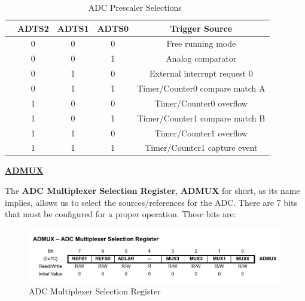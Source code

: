 \begin{table}[H]
    \centering
    \begin{tabular}[t]{lcccc}
        \toprule
        & \textbf{ADTS2} & \textbf{ADTS1} & \textbf{ADTS0} & \textbf{Trigger Source}\\
        \midrule
        & 0 & 0 & 0 & Free running mode               \\
        & 0 & 0 & 1 & Analog comparator               \\
        & 0 & 1 & 0 & External interrupt request 0    \\
        & 0 & 1 & 1 & Timer/Counter0 compare match A  \\
        & 1 & 0 & 0 & Timer/Counter0 overflow         \\
        & 1 & 0 & 1 & Timer/Counter1 compare match B  \\
        & 1 & 1 & 0 & Timer/Counter1 overflow         \\
        & 1 & 1 & 1 & Timer/Counter1 capture event    \\
        \bottomrule
    \end{tabular}
    \caption{ADC Prescaler Selections~\autocite{ATMEGA328P}}
    \label{table:ADC_PRESCALER}
\end{table}

\clearpage

\medskip
\underline{\textbf{ADMUX}}
\medskip

The \textbf{ADC Multiplexer Selection Register}, \textbf{ADMUX} for short, as its name implies, allows us to select the sources/references for the ADC. There are 7 bits that must be configured for a proper operation. These bits are:


\begin{figure}[H]
    \centering
    \includegraphics[width = \textwidth]{Graphics/MICROS/Practice 3/DATASHEET/ADMUX.pdf}
    \caption{ADC Multiplexer Selection Register~\autocite{ATMEGA328P}}
    \label{fig:ADMUX}
\end{figure}

